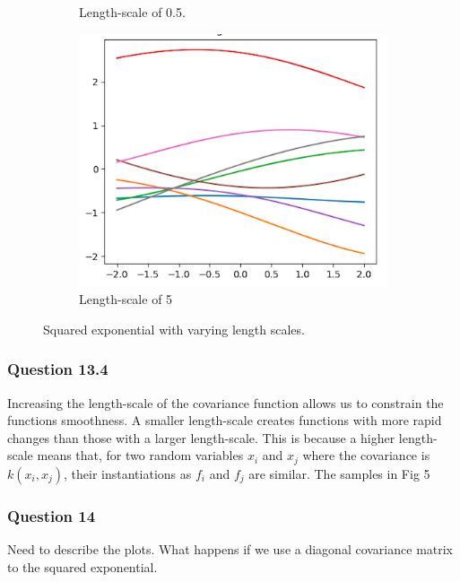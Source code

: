 \documentclass[10pt, a4paper, twocolumn]{article} %
\begin{document}
\begin{figure}[!htb]
\begin{subfigure}{.5\linewidth}
  \caption{Length-scale of 0.5.}
  \label{fig:sub2}
\end{subfigure}
\begin{subfigure}{.5\linewidth}
\centering
\includegraphics[width=0.9\linewidth]{ls5.png}
\caption{Length-scale of 5}
\end{subfigure}
\caption{Squared exponential with varying length scales. }
\label{fig:test}
\end{figure}

\subsubsection*{Question 13.4}
Increasing the length-scale of the covariance function allows us to constrain the functions smoothness. A smaller length-scale creates  functions with more rapid changes than those with a larger length-scale. This is because a higher length-scale means that, for two random variables $x_i$ and $x_j$ where the covariance is $k(x_i, x_j)$, their instantiations as $f_i$ and $f_j$ are similar. 
The samples in Fig 5 

\subsubsection{Question 14}
Need to describe the plots. What happens if we use a diagonal covariance matrix to the squared exponential. 

\end{document}
